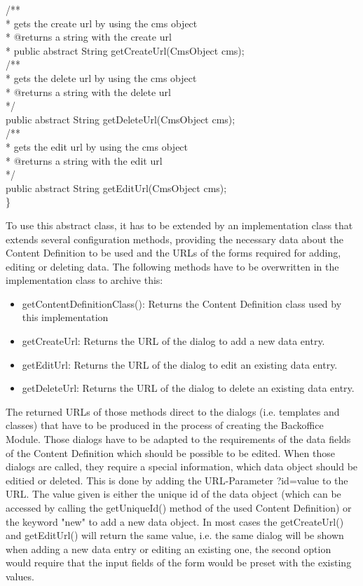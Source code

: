 \begin{java}
/**\\
 * gets the create url by using the cms object\\
 * @returns a string with the create url\\
 * public abstract String getCreateUrl(CmsObject cms);\\
/**\\
 * gets the delete url by using the cms object\\
 * @returns a string with the delete url\\
 */\\
public abstract String getDeleteUrl(CmsObject cms);\\
/**\\
 * gets the edit url by using the cms object\\
 * @returns a string with the edit url\\
 */\\
public abstract String getEditUrl(CmsObject cms);\\
\}\\
\end{java}

To use this abstract class, it has to be extended by an implementation
class that extends several configuration methods, providing the
necessary data about the Content Definition to be used and the URLs of
the forms required for adding, editing or deleting data. The following
methods have to be overwritten in the implementation class to archive
this:
\begin{itemize}
\item getContentDefinitionClass(): Returns the Content Definition
class used by this implementation
\item getCreateUrl: Returns the URL of the dialog to add a new data
entry.
\item getEditUrl: Returns the URL of the dialog to edit an existing
data entry.
\item getDeleteUrl: Returns the URL of the dialog to delete an
existing data entry.
\end{itemize}

The returned URLs of those methods direct to the dialogs (i.e. templates
and classes) that have to be produced in the process of creating the
Backoffice Module. Those dialogs have to be adapted to the requirements
of the data fields of the Content Definition which should be possible to
be edited. When those dialogs are called, they require a special
information, which data object should be editied or deleted.
This is done by adding the URL-Parameter {\code ?id=value} to the URL. The value
given is either the unique id of the data object (which can be accessed
by calling  the {\meth getUniqueId()} method of the used Content Definition) or
the keyword "new" to add a new data object.
In most cases the {\meth getCreateUrl()} and {\meth getEditUrl()} will return the same
value, i.e. the same dialog will be shown when adding a new data entry
or editing an existing one, the second option would require that the
input fields of the form would be preset with the existing values.


